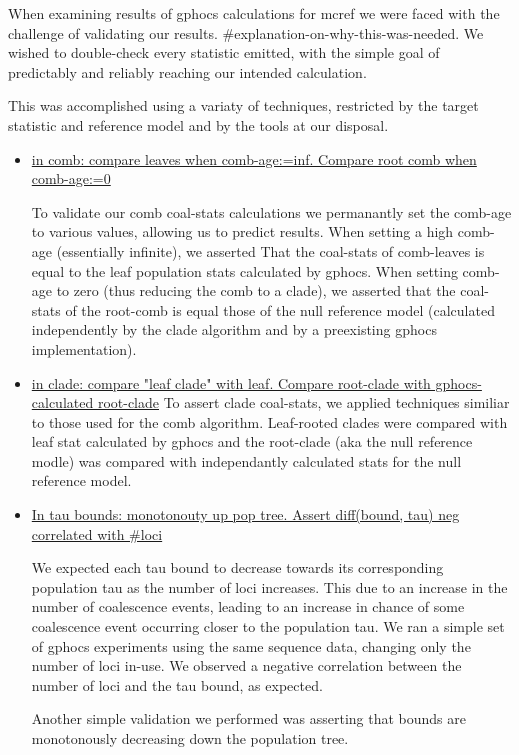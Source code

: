\documentclass[11pt]{article}
\newcommand{\1}{\mathbbm{1}}
\begin{document}
When examining results of gphocs calculations for mcref we were faced with the challenge of validating our results. \#explanation-on-why-this-was-needed. We wished to double-check every statistic emitted, with the simple goal of predictably and reliably reaching our intended calculation.

This was accomplished using a variaty of techniques, restricted by the target statistic and reference model and by the tools at our disposal. 


\begin{itemize}

\item \underline{in comb: compare leaves when comb-age:=inf. Compare root comb when comb-age:=0}

To validate our comb coal-stats calculations we permanantly set the comb-age to various values, allowing us to predict results. When setting a high comb-age (essentially infinite), we asserted That the coal-stats of comb-leaves is equal to the leaf population stats calculated by gphocs. When setting comb-age to zero (thus reducing the comb to a clade), we asserted that the coal-stats of the root-comb is equal those of the null reference model (calculated independently by the clade algorithm and by a preexisting gphocs implementation).



\item \underline{in clade: compare "leaf clade" with leaf. Compare root-clade with gphocs-calculated root-clade}
To assert clade coal-stats, we applied techniques similiar to those used for the comb algorithm. Leaf-rooted clades were compared with leaf stat calculated by gphocs and the root-clade (aka the null reference modle) was compared with independantly calculated stats for the null reference model. 

\item \underline{In tau bounds: monotonouty up pop tree. Assert diff(bound, tau) neg correlated with \#loci}

We expected each tau bound to decrease towards its corresponding population tau as the number of loci increases. This due to an increase in the number of coalescence events, leading to an increase in chance of some coalescence event occurring closer to the population tau. We ran a simple set of gphocs experiments using the same sequence data, changing only the number of loci in-use. We observed a negative correlation between the number of loci and the tau bound, as expected.

Another simple validation we performed was asserting that bounds are monotonously decreasing down the population tree.

\end{itemize}
\end{document}
